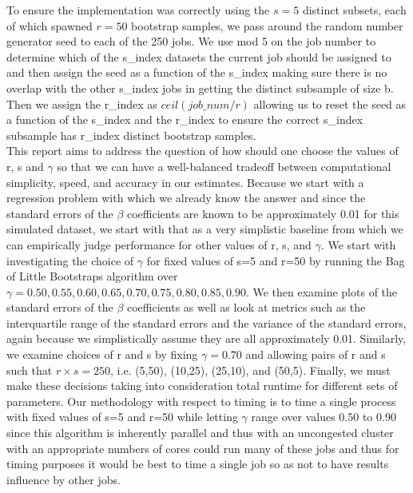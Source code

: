 \documentclass[a4paper, 11pt]{report}
\begin{document}
\begin{enumerate}
			To ensure the implementation was correctly using the $s=5$ distinct subsets, each of which spawned $r=50$ bootstrap samples, we pass around the random number generator seed to each of the 250 jobs.  We use mod 5 on the job number to determine which of the s\_index datasets the current job should be assigned to and then assign the seed as a function of the s\_index making sure there is no overlap with the other s\_index jobs in getting the distinct subsample of size b.  Then we assign the r\_index as $ceil(job\_num/r)$ allowing us to reset the seed as a function of the s\_index and the r\_index to ensure the correct s\_index subsample has r\_index distinct bootstrap samples. \\
						
			This report aims to address the question of how should one choose the values of r, s and $\gamma$ so that we can have a well-balanced tradeoff between computational simplicity, speed, and accuracy in our estimates.  Because we start with a regression problem with which we already know the answer and since the standard errors of the $\beta$ coefficients are known to be approximately 0.01 for this simulated dataset, we start with that as a very simplistic baseline from which we can empirically judge performance for other values of r, s, and $\gamma$.  We start with investigating the choice of $\gamma$ for fixed values of s=5 and r=50 by running the Bag of Little Bootstraps algorithm over $\gamma = 0.50, 0.55, 0.60, 0.65, 0.70, 0.75, 0.80, 0.85, 0.90$.  We then examine plots of the standard errors of the $\beta$ coefficients as well as look at metrics such as the interquartile range of the standard errors and the variance of the standard errors, again because we simplistically assume they are all approximately 0.01.  Similarly, we examine choices of r and s by fixing $\gamma = 0.70$ and allowing pairs of r and s such that $r \times s = 250$, i.e. (5,50), (10,25), (25,10), and (50,5).  Finally, we must make these decisions taking into consideration total runtime for different sets of parameters.  Our methodology with respect to timing is to time a single process with fixed values of s=5 and r=50 while letting $\gamma$ range over values 0.50 to 0.90 since this algorithm is inherently parallel and thus with an uncongested cluster with an appropriate numbers of cores could run many of these jobs and thus for timing purposes it would be best to time a single job so as not to have results influence by other jobs. \\
			

\end{enumerate}
\end{document}
